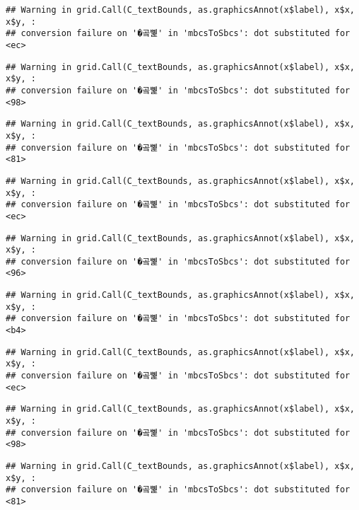 \documentclass[
]{article}
\begin{document}
\begin{verbatim}
## Warning in grid.Call(C_textBounds, as.graphicsAnnot(x$label), x$x, x$y, :
## conversion failure on '�곸뼱' in 'mbcsToSbcs': dot substituted for <ec>
\end{verbatim}

\begin{verbatim}
## Warning in grid.Call(C_textBounds, as.graphicsAnnot(x$label), x$x, x$y, :
## conversion failure on '�곸뼱' in 'mbcsToSbcs': dot substituted for <98>
\end{verbatim}

\begin{verbatim}
## Warning in grid.Call(C_textBounds, as.graphicsAnnot(x$label), x$x, x$y, :
## conversion failure on '�곸뼱' in 'mbcsToSbcs': dot substituted for <81>
\end{verbatim}

\begin{verbatim}
## Warning in grid.Call(C_textBounds, as.graphicsAnnot(x$label), x$x, x$y, :
## conversion failure on '�곸뼱' in 'mbcsToSbcs': dot substituted for <ec>
\end{verbatim}

\begin{verbatim}
## Warning in grid.Call(C_textBounds, as.graphicsAnnot(x$label), x$x, x$y, :
## conversion failure on '�곸뼱' in 'mbcsToSbcs': dot substituted for <96>
\end{verbatim}

\begin{verbatim}
## Warning in grid.Call(C_textBounds, as.graphicsAnnot(x$label), x$x, x$y, :
## conversion failure on '�곸뼱' in 'mbcsToSbcs': dot substituted for <b4>
\end{verbatim}

\begin{verbatim}
## Warning in grid.Call(C_textBounds, as.graphicsAnnot(x$label), x$x, x$y, :
## conversion failure on '�곸뼱' in 'mbcsToSbcs': dot substituted for <ec>
\end{verbatim}

\begin{verbatim}
## Warning in grid.Call(C_textBounds, as.graphicsAnnot(x$label), x$x, x$y, :
## conversion failure on '�곸뼱' in 'mbcsToSbcs': dot substituted for <98>
\end{verbatim}

\begin{verbatim}
## Warning in grid.Call(C_textBounds, as.graphicsAnnot(x$label), x$x, x$y, :
## conversion failure on '�곸뼱' in 'mbcsToSbcs': dot substituted for <81>
\end{verbatim}
\end{document}
